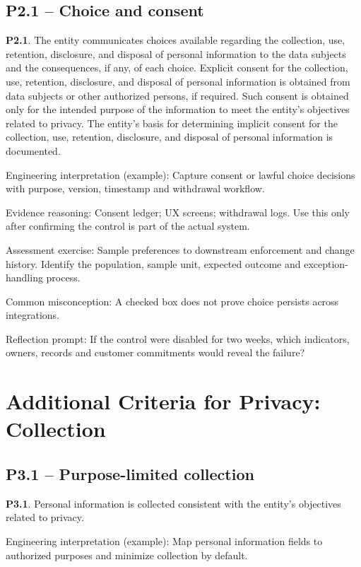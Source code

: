\documentclass[10pt,oneside]{report}
\begin{document}
\subsection{P2.1 -- Choice and consent}
\begin{aicpabox}
\textbf{P2.1}. The entity communicates choices available regarding the collection, use, retention, disclosure, and disposal of personal information to the data subjects and the consequences, if any, of each choice. Explicit consent for the collection, use, retention, disclosure, and disposal of personal information is obtained from data subjects or other authorized persons, if required. Such consent is obtained only for the intended purpose of the information to meet the entity's objectives related to privacy. The entity's basis for determining implicit consent for the collection, use, retention, disclosure, and disposal of personal information is documented.\par{}
\end{aicpabox}
Engineering interpretation (example): Capture consent or lawful choice decisions with purpose, version, timestamp and withdrawal workflow.

Evidence reasoning: Consent ledger; UX screens; withdrawal logs. Use this only after confirming the control is part of the actual system.

Assessment exercise: Sample preferences to downstream enforcement and change history. Identify the population, sample unit, expected outcome and exception-handling process.

Common misconception: A checked box does not prove choice persists across integrations.

Reflection prompt: If the control were disabled for two weeks, which indicators, owners, records and customer commitments would reveal the failure?

\section{Additional Criteria for Privacy: Collection}
\subsection{P3.1 -- Purpose-limited collection}
\begin{aicpabox}
\textbf{P3.1}. Personal information is collected consistent with the entity's objectives related to privacy.\par{}
\end{aicpabox}
Engineering interpretation (example): Map personal information fields to authorized purposes and minimize collection by default.
\end{document}
